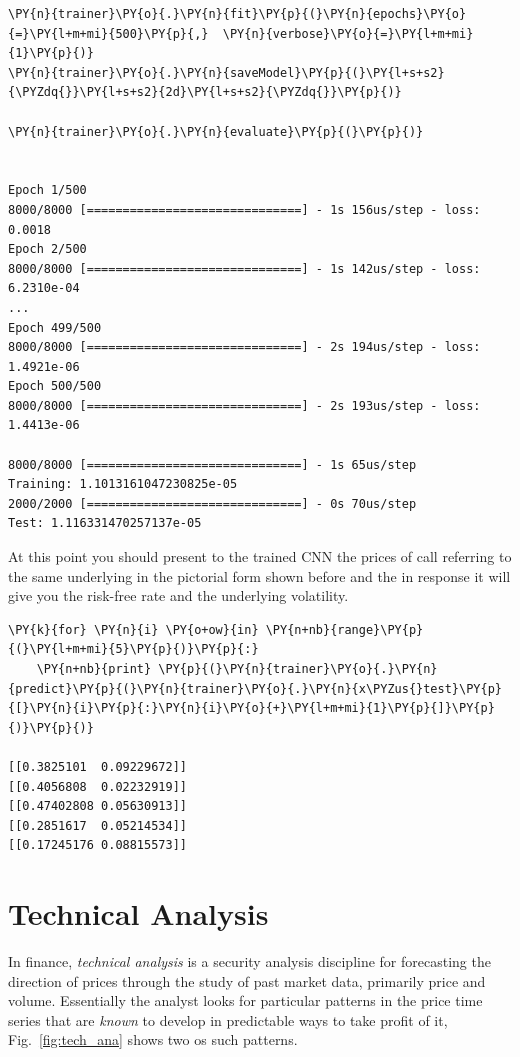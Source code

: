 \begin{tcolorbox}[breakable, size=fbox, boxrule=1pt, pad at break*=1mm,colback=cellbackground, colframe=cellborder]
\begin{Verbatim}[commandchars=\\\{\}]
\PY{n}{trainer}\PY{o}{.}\PY{n}{fit}\PY{p}{(}\PY{n}{epochs}\PY{o}{=}\PY{l+m+mi}{500}\PY{p}{,}  \PY{n}{verbose}\PY{o}{=}\PY{l+m+mi}{1}\PY{p}{)}
\PY{n}{trainer}\PY{o}{.}\PY{n}{saveModel}\PY{p}{(}\PY{l+s+s2}{\PYZdq{}}\PY{l+s+s2}{2d}\PY{l+s+s2}{\PYZdq{}}\PY{p}{)}
	
\PY{n}{trainer}\PY{o}{.}\PY{n}{evaluate}\PY{p}{(}\PY{p}{)}


Epoch 1/500
8000/8000 [==============================] - 1s 156us/step - loss: 0.0018
Epoch 2/500
8000/8000 [==============================] - 1s 142us/step - loss: 6.2310e-04
...
Epoch 499/500
8000/8000 [==============================] - 2s 194us/step - loss: 1.4921e-06
Epoch 500/500
8000/8000 [==============================] - 2s 193us/step - loss: 1.4413e-06

8000/8000 [==============================] - 1s 65us/step
Training: 1.1013161047230825e-05
2000/2000 [==============================] - 0s 70us/step
Test: 1.116331470257137e-05
\end{Verbatim}
\end{tcolorbox}

At this point you should present to the trained CNN the prices of call
referring to the same underlying in the pictorial form shown before and
the in response it will give you the risk-free rate and the underlying
volatility.

\begin{tcolorbox}[breakable, size=fbox, boxrule=1pt, pad at break*=1mm,colback=cellbackground, colframe=cellborder]
\begin{Verbatim}[commandchars=\\\{\}]
\PY{k}{for} \PY{n}{i} \PY{o+ow}{in} \PY{n+nb}{range}\PY{p}{(}\PY{l+m+mi}{5}\PY{p}{)}\PY{p}{:}
    \PY{n+nb}{print} \PY{p}{(}\PY{n}{trainer}\PY{o}{.}\PY{n}{predict}\PY{p}{(}\PY{n}{trainer}\PY{o}{.}\PY{n}{x\PYZus{}test}\PY{p}{[}\PY{n}{i}\PY{p}{:}\PY{n}{i}\PY{o}{+}\PY{l+m+mi}{1}\PY{p}{]}\PY{p}{)}\PY{p}{)}

[[0.3825101  0.09229672]]
[[0.4056808  0.02232919]]
[[0.47402808 0.05630913]]
[[0.2851617  0.05214534]]
[[0.17245176 0.08815573]]
\end{Verbatim}
\end{tcolorbox}

\section{Technical Analysis}\label{technical-analysis}

In finance, \emph{technical analysis} is a security analysis discipline
for forecasting the direction of prices through the study of past market
data, primarily price and volume. Essentially the analyst looks for
particular patterns in the price time series that are \emph{known} to
develop in predictable ways to take profit of it, Fig.~\ref{fig:tech_ana} shows two
os such patterns.

